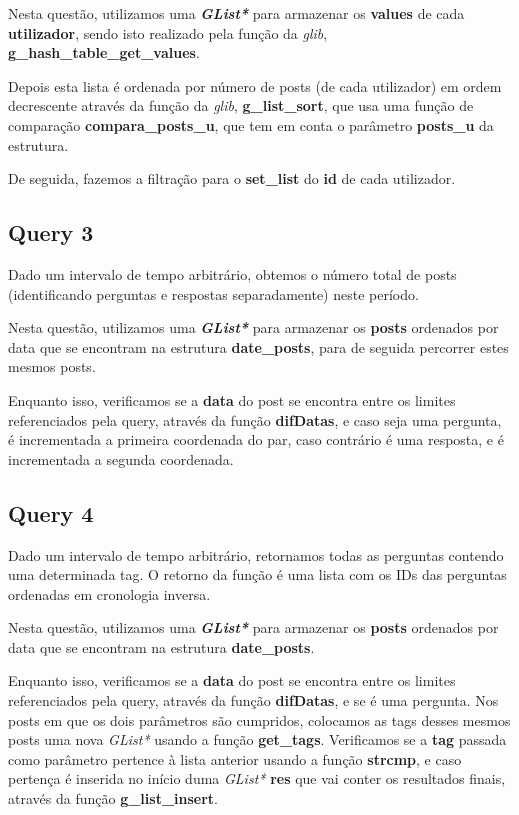\documentclass[a4paper]{article}
\begin{document}
Nesta questão, utilizamos uma \textit{\textbf{GList*}} para armazenar 
os \textbf{values} de cada \textbf{utilizador}, sendo isto realizado
pela função da \textit{glib}, \textbf{g\_hash\_table\_get\_values}.

Depois esta lista é ordenada por número de posts (de cada utilizador)
em ordem decrescente através da função da \textit{glib}, 
\textbf{g\_list\_sort}, que usa uma função de comparação 
\textbf{compara\_posts\_u}, que tem em conta o parâmetro
\textbf{posts\_u} da estrutura.

De seguida, fazemos a filtração para o \textbf{set\_list} do 
\textbf{id} de cada utilizador.

\subsection{Query 3}

Dado um intervalo de tempo arbitrário, obtemos o número total de posts 
(identificando perguntas e respostas separadamente) neste período.

Nesta questão, utilizamos uma \textit{\textbf{GList*}} para armazenar 
os \textbf{posts} ordenados por data que se encontram na estrutura 
\textbf{date\_posts}, para de seguida percorrer estes mesmos posts.

Enquanto isso, verificamos se a \textbf{data} do post se encontra entre 
os limites referenciados pela query, através da função \textbf{difDatas},
e caso seja uma pergunta, é incrementada a primeira coordenada do par,
caso contrário é uma resposta, e é incrementada a segunda coordenada.

\subsection{Query 4}

Dado um intervalo de tempo arbitrário, retornamos todas as perguntas 
contendo uma determinada tag. O retorno da função é uma lista com os IDs 
das perguntas ordenadas em cronologia inversa.

Nesta questão, utilizamos uma \textit{\textbf{GList*}} para armazenar 
os \textbf{posts} ordenados por data que se encontram na estrutura 
\textbf{date\_posts}.

Enquanto isso, verificamos se a \textbf{data} do post se encontra entre 
os limites referenciados pela query, através da função \textbf{difDatas},
e se é uma pergunta. Nos posts em que os dois parâmetros são cumpridos,
colocamos as tags desses mesmos posts uma nova \textit{GList*}
usando a função \textbf{get\_tags}. Verificamos se a \textbf{tag} passada 
como parâmetro pertence à lista anterior usando a função \textbf{strcmp},
e caso pertença é inserida no início duma \textit{GList*} \textbf{res} 
que vai conter os resultados finais, através da função 
\textbf{g\_list\_insert}.
\end{document}
